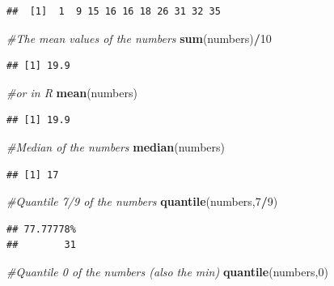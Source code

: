\documentclass[]{book}
\newenvironment{Shaded}{\begin{snugshade}}{\end{snugshade}}
\newcommand{\CommentTok}[1]{\textcolor[rgb]{0.56,0.35,0.01}{\textit{#1}}}
\newcommand{\DecValTok}[1]{\textcolor[rgb]{0.00,0.00,0.81}{#1}}
\newcommand{\KeywordTok}[1]{\textcolor[rgb]{0.13,0.29,0.53}{\textbf{#1}}}
\newcommand{\NormalTok}[1]{#1}
\newcommand{\OperatorTok}[1]{\textcolor[rgb]{0.81,0.36,0.00}{\textbf{#1}}}
\theoremstyle{definition}
\theoremstyle{definition}
\theoremstyle{definition}
\theoremstyle{remark}
\begin{document}
\begin{verbatim}
##  [1]  1  9 15 16 16 18 26 31 32 35
\end{verbatim}

\begin{Shaded}
\begin{Highlighting}[]
\CommentTok{#The mean values of the numbers}
\KeywordTok{sum}\NormalTok{(numbers)}\OperatorTok{/}\DecValTok{10}
\end{Highlighting}
\end{Shaded}

\begin{verbatim}
## [1] 19.9
\end{verbatim}

\begin{Shaded}
\begin{Highlighting}[]
\CommentTok{#or in R}
\KeywordTok{mean}\NormalTok{(numbers)}
\end{Highlighting}
\end{Shaded}

\begin{verbatim}
## [1] 19.9
\end{verbatim}

\begin{Shaded}
\begin{Highlighting}[]
\CommentTok{#Median of the numbers}
\KeywordTok{median}\NormalTok{(numbers)}
\end{Highlighting}
\end{Shaded}

\begin{verbatim}
## [1] 17
\end{verbatim}

\begin{Shaded}
\begin{Highlighting}[]
\CommentTok{#Quantile 7/9 of the numbers}
\KeywordTok{quantile}\NormalTok{(numbers,}\DecValTok{7}\OperatorTok{/}\DecValTok{9}\NormalTok{)}
\end{Highlighting}
\end{Shaded}

\begin{verbatim}
## 77.77778% 
##        31
\end{verbatim}

\begin{Shaded}
\begin{Highlighting}[]
\CommentTok{#Quantile 0 of the numbers (also the min)}
\KeywordTok{quantile}\NormalTok{(numbers,}\DecValTok{0}\NormalTok{)}
\end{Highlighting}
\end{Shaded}
\end{document}

